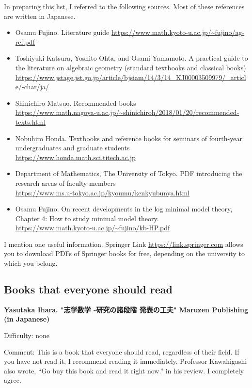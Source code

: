 In preparing this list, I referred to the following sources. Most of these references are written in Japanese.
\vspace{-8pt}
\begin{itemize}[left=0pt]
  \setlength{\parskip}{0cm} %
  \setlength{\itemsep}{4pt} %
\item Osamu Fujino. Literature guide  \url{https://www.math.kyoto-u.ac.jp/~fujino/ag-ref.pdf}
\item Toshiyuki Katsura, Yoshito Ohta, and Osami Yamamoto. 
  A practical guide to the literature on algebraic geometry (standard textbooks and classical books) \url{https://www.jstage.jst.go.jp/article/bjsiam/14/3/14_KJ00003509979/_article/-char/ja/}
\item Shinichiro Matsuo. Recommended books   \\ \url{https://www.math.nagoya-u.ac.jp/~shinichiroh/2018/01/20/recommended-texts.html}
\item Nobuhiro Honda. Textbooks and reference books for seminars of fourth-year undergraduates and graduate students  \\ \url{https://www.honda.math.sci.titech.ac.jp}
\item Department of Mathematics, The University of Tokyo. PDF introducing the research areas of faculty members \\ \url{https://www.ms.u-tokyo.ac.jp/kyoumu/kenkyubunya.html}
\item Osamu Fujino. On recent developments in the log minimal model theory, Chapter 4: How to study minimal model theory. \\ \url{https://www.math.kyoto-u.ac.jp/~fujino/kb-HP.pdf}
\end{itemize}

I mention one useful information. Springer Link \url{https://link.springer.com} allows you to download PDFs of Springer books for free, depending on the university to which you belong.

\subsection{Books that everyone should read}

\textbf{Yasutaka Ihara. "志学数学 -研究の諸段階 発表の工夫" Maruzen Publishing (in Japanese)} \vspace{-6pt}

Difficulty: none \vspace{-6pt}

Comment: This is a book that everyone should read, regardless of their field. If you have not read it, I recommend reading it immediately. Professor Kawahigashi also wrote, ``Go buy this book and read it right now.'' in his review. I completely agree.

